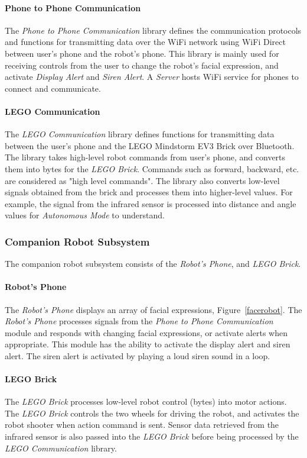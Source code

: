 \documentclass[12pt]{article}
\begin{document}
\paragraph{Phone to Phone Communication}
The \textit{Phone to Phone Communication} library defines the communication protocols and functions for transmitting data over the WiFi network using WiFi Direct between user's phone and the robot's phone. This library is mainly used for receiving controls from the user to change the robot's facial expression, and activate \textit{Display Alert} and \textit{Siren Alert}. A \textit{Server} hosts WiFi service for phones to connect and communicate.

\paragraph{LEGO Communication}
The \textit{LEGO Communication} library defines functions for transmitting data between the user's phone and the LEGO Mindstorm EV3 Brick over Bluetooth. The library takes high-level robot commands from user's phone, and converts them into bytes for the \textit{LEGO Brick}. Commands such as forward, backward, etc. are considered as "high level commands". The library also converts low-level signals obtained from the brick and processes them into higher-level values. For example, the signal from the infrared sensor is processed into distance and angle values for \textit{Autonomous Mode} to understand.

\subsubsection{Companion Robot Subsystem}
The companion robot subsystem consists of the \textit{Robot's Phone}, and \textit{LEGO Brick}.

\paragraph{Robot's Phone}
The \textit{Robot's Phone} displays an array of facial expressions, Figure~\ref{facerobot}. The \textit{Robot's Phone} processes signals from the \textit{Phone to Phone Communication} module and responds with changing facial expressions, or activate alerts when appropriate. This module has the ability to activate the display alert and siren alert. The siren alert is activated by playing a loud siren sound in a loop.

\paragraph{LEGO Brick}
The \textit{LEGO Brick} processes low-level robot control (bytes) into motor actions. The \textit{LEGO Brick} controls the two wheels for driving the robot, and activates the robot shooter when action command is sent. Sensor data retrieved from the infrared sensor is also passed into the \textit{LEGO Brick} before being processed by the \textit{LEGO Communication} library.
\end{document}
